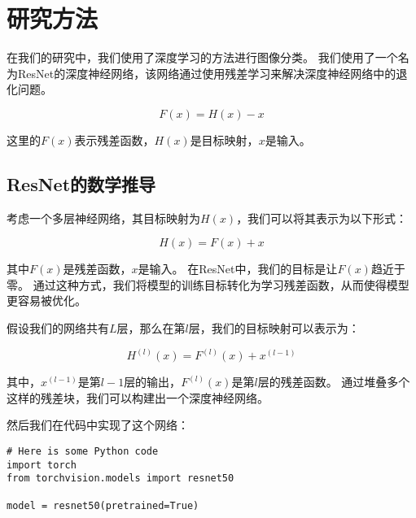 

\section{研究方法}\label{sec:methodology}

在我们的研究中，我们使用了深度学习的方法进行图像分类。
我们使用了一个名为ResNet的深度神经网络，该网络通过使用残差学习来解决深度神经网络中的退化问题。\par
\begin{equation}
    F(x) = H(x) - x\label{eq:resnet}
\end{equation}

这里的\(F(x)\)表示残差函数，\(H(x)\)是目标映射，\(x\)是输入。\par
\subsection{ResNet的数学推导}\label{subsec:resnet-derivation}

考虑一个多层神经网络，其目标映射为\(H(x)\)，我们可以将其表示为以下形式：

\begin{equation}
    H(x) = F(x) + x\label{eq:resnet-target}
\end{equation}

其中\(F(x)\)是残差函数，\(x\)是输入。
在ResNet中，我们的目标是让\(F(x)\)趋近于零。
通过这种方式，我们将模型的训练目标转化为学习残差函数，从而使得模型更容易被优化。\par
假设我们的网络共有\(L\)层，那么在第\(l\)层，我们的目标映射可以表示为：

\begin{equation}
    H^{(l)}(x) = F^{(l)}(x) + x^{(l-1)}\label{eq:resnet-layer}
\end{equation}

其中，\(x^{(l-1)}\)是第\(l-1\)层的输出，\(F^{(l)}(x)\)是第\(l\)层的残差函数。
通过堆叠多个这样的残差块，我们可以构建出一个深度神经网络。\par
然后我们在代码中实现了这个网络：

\begin{verbatim}
# Here is some Python code
import torch
from torchvision.models import resnet50

model = resnet50(pretrained=True)
\end{verbatim}

